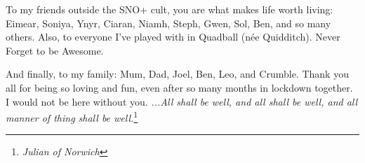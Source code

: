 \begin{acknowledgements}
To my friends outside the SNO+ cult, you are what makes life worth living: Eimear, Soniya, Ynyr, Ciaran, Niamh, Steph, Gwen, Sol, Ben, and so many others. Also, to everyone I've played with in Quadball (n\'{e}e Quidditch). Never Forget to be Awesome.

And finally, to my family: Mum, Dad, Joel, Ben, Leo, and Crumble. Thank you all for being so loving and fun, even after so many months in lockdown together. I would not be here without you. \textit{...All shall be well, and all shall be well, and all manner of thing shall be well.}\footnote{\textit{Julian of Norwich}}

\end{acknowledgements}
